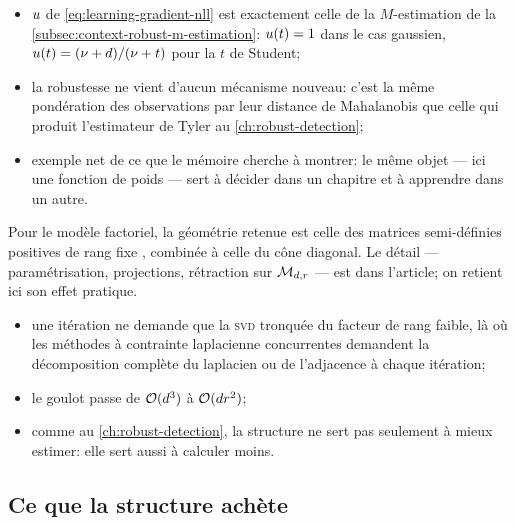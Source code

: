 \begin{remark}
\label{rem:learning-poids}
  \begin{itemize}
    \item $u$ de \cref{eq:learning-gradient-nll} est exactement celle de
      la $M$-estimation de la \cref{subsec:context-robust-m-estimation}:
      $u(t)=1$ dans le cas gaussien,
      $u(t)=(\nu+d)/(\nu+t)$ pour la $t$ de Student;
    \item la robustesse ne vient d'aucun mécanisme nouveau: c'est la même
      pondération des observations par leur distance de Mahalanobis que celle
      qui produit l'estimateur de Tyler au \cref{ch:robust-detection};
    \item exemple net de ce que le mémoire cherche à montrer: le même objet ---
      ici une fonction de poids --- sert à décider dans un chapitre et à
      apprendre dans un autre.
  \end{itemize}
  \leavevmode
\end{remark}

Pour le modèle factoriel, la géométrie retenue est celle des matrices
semi-définies positives de rang fixe
, combinée à celle
du cône diagonal. Le détail --- paramétrisation, projections, rétraction sur
$\mathcal{M}_{d,r}$ --- est dans l'article; on retient ici son effet
pratique.

\begin{remark}
\label{rem:learning-gain-algorithmique}
  \begin{itemize}
    \item une itération ne demande que la \textsc{svd} tronquée du facteur de
      rang faible, là où les méthodes à contrainte laplacienne concurrentes
      demandent la décomposition complète du laplacien ou de l'adjacence à
      chaque itération;
    \item le goulot passe de $\mathcal{O}(d^3)$ à $\mathcal{O}(dr^2)$;
    \item comme au \cref{ch:robust-detection}, la structure ne sert pas
      seulement à mieux estimer: elle sert aussi à calculer moins.
  \end{itemize}
  \leavevmode
\end{remark}

\subsection{Ce que la structure achète}
\label{subsec:learning-graphe-resultats}

